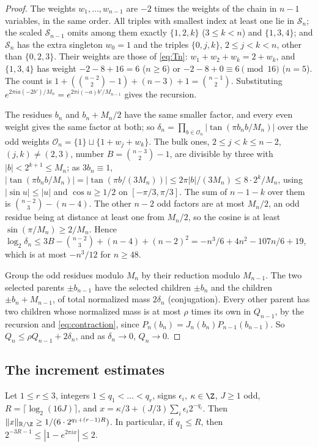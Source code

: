 \begin{proof}
The weights $w_1,\dots,w_{n-1}$ are $-2$ times the weights of the chain in
$n-1$ variables, in the same order. All triples with smallest index at least one
lie in $\mathcal S_n$; the scaled $\mathcal S_{n-1}$ omits among them exactly
$\{1,2,k\}$ ($3\le k<n$) and $\{1,3,4\}$; and $\mathcal S_n$ has the extra
singleton $w_0=1$ and the triples $\{0,j,k\}$, $2\le j<k<n$, other than
$\{0,2,3\}$. Their weights are those of \eqref{eq:Tn}: $w_1+w_2+w_k=2+w_k$, and
$\{1,3,4\}$ has weight $-2-8+16=6$ ($n\ge6$) or $-2-8+0\equiv6\pmod{16}$ ($n=5$).
The count is $1+(\binom{n-2}2-1)+(n-3)+1=\binom{n-1}2$. Substituting
$e^{2\pi i a(-2b')/M_n}=e^{2\pi i(-a)b'/M_{n-1}}$ gives the recursion.

The residues $b_n$ and $b_n+M_n/2$ have the same smaller factor, and every even
weight gives the same factor at both; so $\delta_n=\prod_{b\in\mathcal O_n}
|\tan(\pi b_nb/M_n)|$ over the odd weights $\mathcal O_n=\{1\}\sqcup\{1+w_j+w_k\}$.
The bulk ones, $2\le j<k\le n-2$, $(j,k)\ne(2,3)$, number
$B=\binom{n-3}2-1$, are divisible by three with $|b|<2^{k+1}\le M_n$; as
$3b_n\equiv1$, $|\tan(\pi b_nb/M_n)|=|\tan(\pi b/(3M_n))|\le2\pi|b|/(3M_n)\le
8\cdot2^k/M_n$, using $|\sin u|\le|u|$ and $\cos u\ge1/2$ on $[-\pi/3,\pi/3]$.
The sum of $n-1-k$ over them is $\binom{n-2}3-(n-4)$. The other $n-2$ odd
factors are at most $M_n/2$, an odd residue being at distance at least one from
$M_n/2$, so the cosine is at least $\sin(\pi/M_n)\ge2/M_n$. Hence
$\log_2\delta_n\le3B-\binom{n-2}3+(n-4)+(n-2)^2=-n^3/6+4n^2-107n/6+19$, which
is at most $-n^3/12$ for $n\ge48$.

Group the odd residues modulo $M_n$ by their reduction modulo $M_{n-1}$. The
two selected parents $\pm b_{n-1}$ have the selected children $\pm b_n$ and the
children $\pm b_n+M_{n-1}$, of total normalized mass $2\delta_n$ (conjugation).
Every other parent has two children whose normalized mass is at most $\rho$
times its own in $Q_{n-1}$, by the recursion and \eqref{eq:contraction}, since
$P_n(b_n)=J_n(b_n)P_{n-1}(b_{n-1})$. So $Q_n\le\rho Q_{n-1}+2\delta_n$, and as
$\delta_n\to0$, $Q_n\to0$.
\end{proof}

\subsection{The increment estimates}

\begin{lemma}\label{lem:sparse}
Let $1\le r\le3$, integers $1\le q_1<\dots<q_r$, signs $\epsilon_i$,
$\kappa\in\Z$, $J\ge1$ odd, $R=\lceil\log_2(16J)\rceil$, and
$x=\kappa/3+(J/3)\sum_i\epsilon_i2^{-q_i}$. Then $\|x\|_{\mathbb R/\Z}\ge
1/(6\cdot2^{q_1+(r-1)R})$. In particular, if $q_1\le R$, then
$2^{-3R-1}\le|1-e^{2\pi ix}|\le2$.
\end{lemma}

